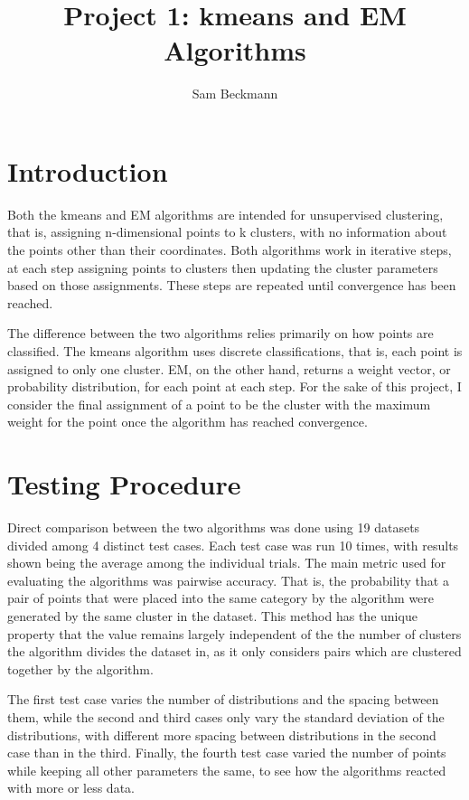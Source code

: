 \documentclass[a4paper]{article}
\title{Project 1: kmeans and EM Algorithms}
\author{Sam Beckmann}
\begin{document}
\maketitle

\section{Introduction}

Both the kmeans and EM algorithms are intended for unsupervised clustering, that is, assigning n-dimensional points to k clusters, with no information about the points other than their coordinates. Both algorithms work in iterative steps, at each step assigning points to clusters then updating the cluster parameters based on those assignments. These steps are repeated until convergence has been reached. 

The difference between the two algorithms relies primarily on how points are classified. The kmeans algorithm uses discrete classifications, that is, each point is assigned to only one cluster. EM, on the other hand, returns a weight vector, or probability distribution, for each point at each step. For the sake of this project, I consider the final assignment of a point to be the cluster with the maximum weight for the point once the algorithm has reached convergence.

\section{Testing Procedure}

Direct comparison between the two algorithms was done using 19 datasets divided among 4 distinct test cases. Each test case was run 10 times, with results shown being the average among the individual trials. The main metric used for evaluating the algorithms was pairwise accuracy. That is, the probability that a pair of points that were placed into the same category by the algorithm were generated by the same cluster in the dataset. This method has the unique property that the value remains largely independent of the the number of clusters the algorithm divides the dataset in, as it only considers pairs which are clustered together by the algorithm.

The first test case varies the number of distributions and the spacing between them, while the second and third cases only vary the standard deviation of the distributions, with different more spacing between distributions in the second case than in the third. Finally, the fourth test case varied the number of points while keeping all other parameters the same, to see how the algorithms reacted with more or less data.
\end{document}

